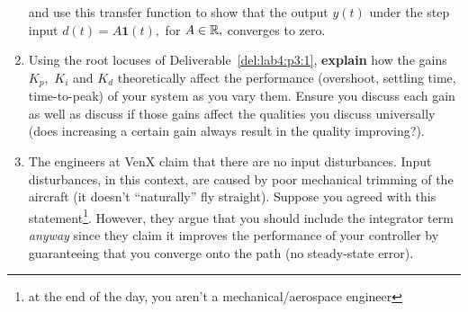 \begin{deliverable}[label={lab4:report}]
\begin{enumerate}[label={(\arabic*)}]
{\begin{center}
      \end{center}
      and use this transfer function to show that the output \(y(t)\) under the step input \(d(t) = A \mathbf{1}(t),\) for \(A \in \mathbb{R},\) converges to zero.
      \label{lab4:report:q3}
    }
    \item{%
      Using the root locuses of Deliverable~\ref{del:lab4:p3:1}, \textbf{explain} how the gains \(K_p,\) \(K_i\) and \(K_d\) theoretically affect the performance (overshoot, settling time, time-to-peak) of your system as you vary them.
      Ensure you discuss each gain as well as discuss if those gains affect the qualities you discuss universally (does increasing a certain gain always result in the quality improving?).
      \label{lab4:report:q4}
    }
    \item{%
      The engineers at VenX claim that there are no input disturbances.
      Input disturbances, in this context, are caused by poor mechanical trimming of the aircraft (it doesn't ``naturally'' fly straight).
      Suppose you agreed with this statement\footnote{at the end of the day, you aren't a mechanical/aerospace engineer}.
      However, they argue that you should include the integrator term \emph{anyway} since they claim it improves the performance of your controller by guaranteeing that you converge onto the path (no steady-state error).

}
\end{enumerate}
\end{deliverable}
